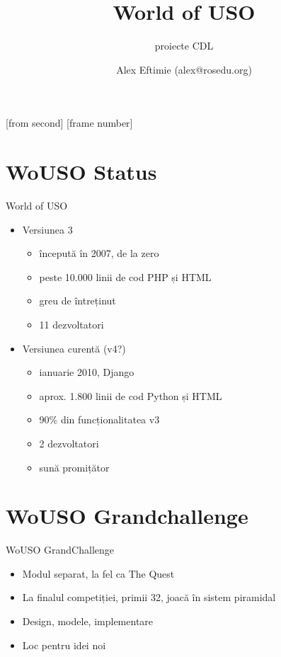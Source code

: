 \documentclass{beamer}
\title[WoUSO]{World of USO}
\subtitle{proiecte CDL}
\institute[ROSEdu]{ROSEdu}
\author[alex3f]{Alex Eftimie (alex@rosedu.org)}
\begin{document}
[from second]
[frame number]

\frame{\titlepage}

\section{WoUSO Status}


\begin{frame}{World of USO}
\begin{itemize}
	\item Versiunea 3
	\begin{itemize}
	\item începută în 2007, de la zero
	\item peste 10.000 linii de cod PHP și HTML
	\item greu de întreținut
	\item 11 dezvoltatori
	\end{itemize}
	\pause
	\item Versiunea curentă (v4?)
	\begin{itemize}
	\item ianuarie 2010, Django
	\item aprox. 1.800 linii de cod Python și HTML
	\item 90\% din funcționalitatea v3
	\item 2 dezvoltatori
	\item sună promițător
	\end{itemize}
\end{itemize}
\end{frame}

\section{WoUSO Grandchallenge}

\begin{frame}{WoUSO GrandChallenge}
  \begin{itemize}
    \item Modul separat, la fel ca The Quest
    \item La finalul competiției, primii 32, joacă în sistem piramidal
    \item Design, modele, implementare
    \item Loc pentru idei noi
  \end{itemize}
\end{frame}
\end{document}
